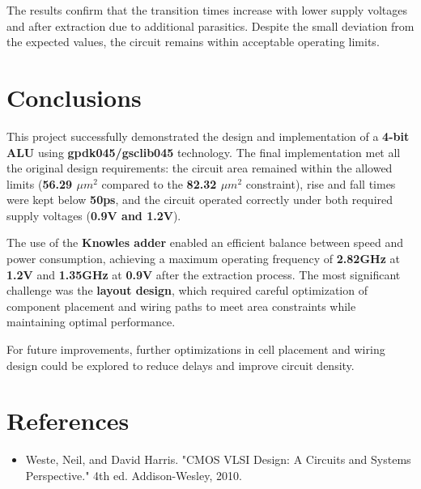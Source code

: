 \documentclass[a4paper,12pt]{article}
\begin{document}
The results confirm that the transition times increase with lower supply voltages and after extraction due to additional parasitics. Despite the small deviation from the expected values, the circuit remains within acceptable operating limits.


\section{Conclusions}
This project successfully demonstrated the design and implementation of a \textbf{4-bit ALU} using \textbf{gpdk045/gsclib045} technology. The final implementation met all the original design requirements: the circuit area remained within the allowed limits (\textbf{56.29 $\mu m^2$} compared to the \textbf{82.32 $\mu m^2$} constraint), rise and fall times were kept below \textbf{50ps}, and the circuit operated correctly under both required supply voltages (\textbf{0.9V and 1.2V}).

The use of the \textbf{Knowles adder} enabled an efficient balance between speed and power consumption, achieving a maximum operating frequency of \textbf{2.82GHz} at \textbf{1.2V} and \textbf{1.35GHz} at \textbf{0.9V} after the extraction process. The most significant challenge was the \textbf{layout design}, which required careful optimization of component placement and wiring paths to meet area constraints while maintaining optimal performance.

For future improvements, further optimizations in cell placement and wiring design could be explored to reduce delays and improve circuit density.

\section{References}
\begin{itemize}
    \item Weste, Neil, and David Harris. "CMOS VLSI Design: A Circuits and Systems Perspective." 4th ed. Addison-Wesley, 2010.
\end{itemize}
\end{document}
